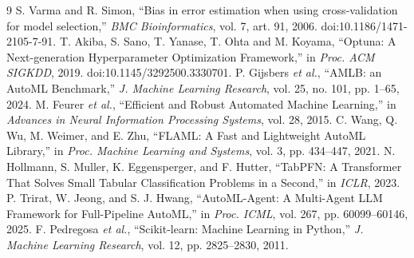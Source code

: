 \documentclass[11pt,a4paper]{article}
\begin{document}
\clearpage
\begin{thebibliography}{9}
 S. Varma and R. Simon, ``Bias in error estimation when using cross-validation for model selection,'' \emph{BMC Bioinformatics}, vol. 7, art. 91, 2006. doi:10.1186/1471-2105-7-91.
 T. Akiba, S. Sano, T. Yanase, T. Ohta and M. Koyama, ``Optuna: A Next-generation Hyperparameter Optimization Framework,'' in \emph{Proc. ACM SIGKDD}, 2019. doi:10.1145/3292500.3330701.
 P. Gijsbers \emph{et al.}, ``AMLB: an AutoML Benchmark,'' \emph{J. Machine Learning Research}, vol. 25, no. 101, pp. 1--65, 2024.
 M. Feurer \emph{et al.}, ``Efficient and Robust Automated Machine Learning,'' in \emph{Advances in Neural Information Processing Systems}, vol. 28, 2015.
 C. Wang, Q. Wu, M. Weimer, and E. Zhu, ``FLAML: A Fast and Lightweight AutoML Library,'' in \emph{Proc. Machine Learning and Systems}, vol. 3, pp. 434--447, 2021.
 N. Hollmann, S. Muller, K. Eggensperger, and F. Hutter, ``TabPFN: A Transformer That Solves Small Tabular Classification Problems in a Second,'' in \emph{ICLR}, 2023.
 P. Trirat, W. Jeong, and S. J. Hwang, ``AutoML-Agent: A Multi-Agent LLM Framework for Full-Pipeline AutoML,'' in \emph{Proc. ICML}, vol. 267, pp. 60099--60146, 2025.
 F. Pedregosa \emph{et al.}, ``Scikit-learn: Machine Learning in Python,'' \emph{J. Machine Learning Research}, vol. 12, pp. 2825--2830, 2011.
\end{thebibliography}
\end{document}
